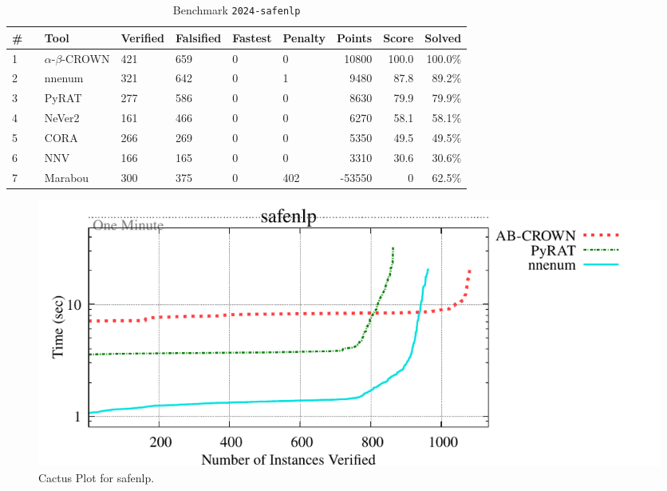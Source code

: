 \begin{table}[h]
\begin{center}
\caption{Benchmark \texttt{2024-safenlp}} \label{tab:cat_{cat}}
{\setlength{\tabcolsep}{2pt}
\begin{tabular}[h]{@{}llllllrrr@{}}
\toprule
\textbf{\# ~} & \textbf{Tool} & \textbf{Verified} & \textbf{Falsified} & \textbf{Fastest} & \textbf{Penalty} & \textbf{Points} & \textbf{Score} & \textbf{Solved}\\
\midrule
1 & $\alpha$-$\beta$-CROWN & 421 & 659 & 0 & 0 & 10800 & 100.0 & 100.0\% \\
2 & nnenum & 321 & 642 & 0 & 1 & 9480 & 87.8 & 89.2\% \\
3 & PyRAT & 277 & 586 & 0 & 0 & 8630 & 79.9 & 79.9\% \\
4 & NeVer2 & 161 & 466 & 0 & 0 & 6270 & 58.1 & 58.1\% \\
5 & CORA & 266 & 269 & 0 & 0 & 5350 & 49.5 & 49.5\% \\
6 & NNV & 166 & 165 & 0 & 0 & 3310 & 30.6 & 30.6\% \\
7 & Marabou & 300 & 375 & 0 & 402 & -53550 & 0 & 62.5\% \\
\bottomrule
\end{tabular}
}
\end{center}
\end{table}



\begin{figure}[h]
\centerline{\includegraphics[width=\textwidth]{cactus/2024_safenlp.pdf}}
\caption{Cactus Plot for safenlp.}
\label{fig:quantPic}
\end{figure}


\clearpage

